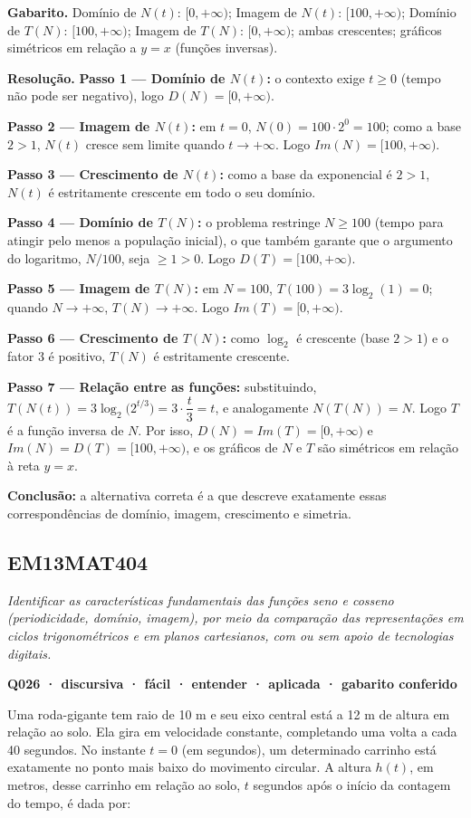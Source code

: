 \documentclass[11pt,a4paper]{article}
\begin{document}
\textbf{Gabarito.} Domínio de $N(t)$: $[0,+\infty)$; Imagem de $N(t)$: $[100,+\infty)$; Domínio de $T(N)$: $[100,+\infty)$; Imagem de $T(N)$: $[0,+\infty)$; ambas crescentes; gráficos simétricos em relação a $y=x$ (funções inversas).

\textbf{Resolução.} \textbf{Passo 1 — Domínio de $N(t)$:} o contexto exige $t \geq 0$ (tempo não pode ser negativo), logo $D(N) = [0,+\infty)$.

\textbf{Passo 2 — Imagem de $N(t)$:} em $t=0$, $N(0) = 100 \cdot 2^0 = 100$; como a base $2>1$, $N(t)$ cresce sem limite quando $t \to +\infty$. Logo $Im(N) = [100,+\infty)$.

\textbf{Passo 3 — Crescimento de $N(t)$:} como a base da exponencial é $2>1$, $N(t)$ é estritamente crescente em todo o seu domínio.

\textbf{Passo 4 — Domínio de $T(N)$:} o problema restringe $N \geq 100$ (tempo para atingir pelo menos a população inicial), o que também garante que o argumento do logaritmo, $N/100$, seja $\geq 1 > 0$. Logo $D(T) = [100,+\infty)$.

\textbf{Passo 5 — Imagem de $T(N)$:} em $N=100$, $T(100) = 3\log_2(1) = 0$; quando $N \to +\infty$, $T(N) \to +\infty$. Logo $Im(T) = [0,+\infty)$.

\textbf{Passo 6 — Crescimento de $T(N)$:} como $\log_2$ é crescente (base $2>1$) e o fator $3$ é positivo, $T(N)$ é estritamente crescente.

\textbf{Passo 7 — Relação entre as funções:} substituindo, $T(N(t)) = 3\log_2\!\big(2^{t/3}\big) = 3\cdot\dfrac{t}{3} = t$, e analogamente $N(T(N))=N$. Logo $T$ é a função inversa de $N$. Por isso, $D(N)=Im(T)=[0,+\infty)$ e $Im(N)=D(T)=[100,+\infty)$, e os gráficos de $N$ e $T$ são simétricos em relação à reta $y=x$.

\textbf{Conclusão:} a alternativa correta é a que descreve exatamente essas correspondências de domínio, imagem, crescimento e simetria.
\subsection*{EM13MAT404}
{\small\itshape Identificar as características fundamentais das funções seno e cosseno (periodicidade, domínio, imagem), por meio da comparação das representações em ciclos trigonométricos e em planos cartesianos, com ou sem apoio de tecnologias digitais.}

\bigskip\noindent\textbf{Q026 · discursiva · fácil · entender · aplicada · gabarito conferido}\par\nopagebreak
Uma roda-gigante tem raio de 10 m e seu eixo central está a 12 m de altura em relação ao solo. Ela gira em velocidade constante, completando uma volta a cada 40 segundos. No instante $t = 0$ (em segundos), um determinado carrinho está exatamente no ponto mais baixo do movimento circular. A altura $h(t)$, em metros, desse carrinho em relação ao solo, $t$ segundos após o início da contagem do tempo, é dada por:
\end{document}
